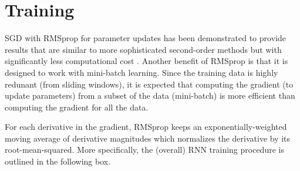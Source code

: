\section{Training}


SGD with RMSprop \cite{Tieleman2012} for parameter updates has been demonstrated to provide results that are similar to more sophisticated second-order methods but with significantly less computational cost \cite{Dauphin}.
%
Another benefit of RMSprop is that it is designed to work with mini-batch learning.
%
Since the training data is highly redunant (from sliding windows), it is expected that computing the gradient (to update parameters) from a subset of the data (mini-batch) is more efficient than computing the gradient for all the data.


For each derivative in the gradient, RMSprop keeps an exponentially-weighted moving average of derivative magnitudes which normalizes the derivative by its root-mean-squared.
%
More specifically, the (overall) RNN training procedure is outlined in the following box.

